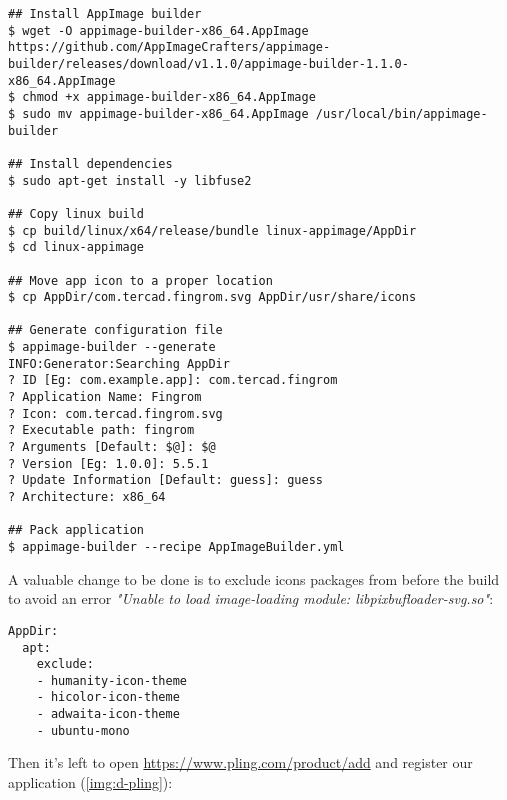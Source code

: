 \begin{lstlisting}[language=terminal]
## Install AppImage builder
$ wget -O appimage-builder-x86_64.AppImage https://github.com/AppImageCrafters/appimage-builder/releases/download/v1.1.0/appimage-builder-1.1.0-x86_64.AppImage
$ chmod +x appimage-builder-x86_64.AppImage
$ sudo mv appimage-builder-x86_64.AppImage /usr/local/bin/appimage-builder

## Install dependencies
$ sudo apt-get install -y libfuse2

## Copy linux build
$ cp build/linux/x64/release/bundle linux-appimage/AppDir
$ cd linux-appimage

## Move app icon to a proper location
$ cp AppDir/com.tercad.fingrom.svg AppDir/usr/share/icons

## Generate configuration file
$ appimage-builder --generate
INFO:Generator:Searching AppDir
? ID [Eg: com.example.app]: com.tercad.fingrom
? Application Name: Fingrom
? Icon: com.tercad.fingrom.svg
? Executable path: fingrom
? Arguments [Default: $@]: $@
? Version [Eg: 1.0.0]: 5.5.1
? Update Information [Default: guess]: guess
? Architecture: x86_64

## Pack application
$ appimage-builder --recipe AppImageBuilder.yml
\end{lstlisting}

\noindent A valuable change  to be done is to exclude icons packages from  before 
the build to avoid an error \emph{"Unable to load image-loading module: libpixbufloader-svg.so"}:

\begin{lstlisting}[language=terminal]
AppDir:
  apt:
    exclude:
    - humanity-icon-theme
    - hicolor-icon-theme
    - adwaita-icon-theme
    - ubuntu-mono
\end{lstlisting}

\noindent Then it's left to open \href{https://www.pling.com/product/add}{https://www.pling.com/product/add}
and register our application (\cref{img:d-pling}):

